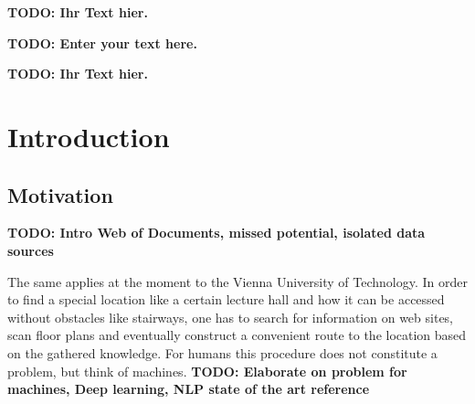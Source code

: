 \documentclass[draft,final]{vutinfth} %
\newcommand{\todo}[1]{{\color{red}\textbf{TODO: {#1}}}} %
\begin{document}

\frontmatter %

\addstatementpage

\begin{danksagung*}
\todo{Ihr Text hier.}
\end{danksagung*}

\begin{acknowledgements*}
\todo{Enter your text here.}
\end{acknowledgements*}

\begin{kurzfassung}
\todo{Ihr Text hier.}
\end{kurzfassung}

\begin{abstract}
\todo{Enter your text here.}
\end{abstract}


\tableofcontents %

\mainmatter

\chapter{Introduction}

\section{Motivation}
\todo{Intro Web of Documents, missed potential, isolated data sources}

The same applies at the moment to the Vienna University of Technology. In order to find a special location like a certain lecture hall and how it can be accessed without obstacles like stairways, one has to search for information on web sites, scan floor plans and eventually construct a convenient route to the location based on the gathered knowledge. For humans this procedure does not constitute a problem, but think of machines.
\todo{Elaborate on problem for machines, Deep learning, NLP state of the art reference}
\end{document}
